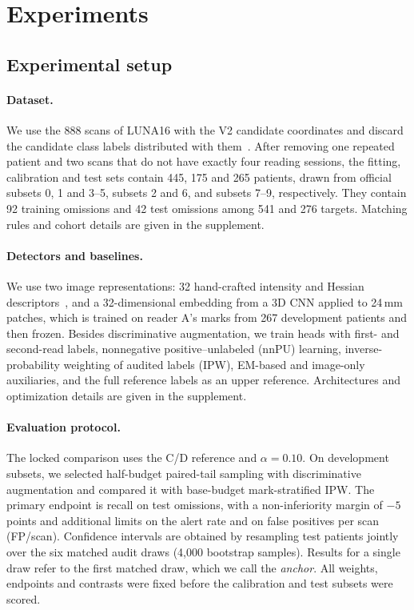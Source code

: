 \section{Experiments}
\label{sec:yield}

\subsection{Experimental setup}
\label{sec:setup}

\paragraph{Dataset.}
We use the 888 scans of LUNA16 with the V2 candidate coordinates and discard the candidate class labels distributed with them~\cite{setio2017,luna16v2}. After removing one repeated patient and two scans that do not have exactly four reading sessions, the fitting, calibration and test sets contain 445, 175 and 265 patients, drawn from official subsets 0, 1 and 3--5, subsets 2 and 6, and subsets 7--9, respectively. They contain 92 training omissions and 42 test omissions among 541 and 276 targets. Matching rules and cohort details are given in the supplement.

\paragraph{Detectors and baselines.}
We use two image representations: 32 hand-crafted intensity and Hessian descriptors~\cite{li2003}, and a 32-dimensional embedding from a 3D CNN applied to 24\,mm patches, which is trained on reader A's marks from 267 development patients and then frozen. Besides discriminative augmentation, we train heads with first- and second-read labels, nonnegative positive--unlabeled (nnPU) learning, inverse-probability weighting of audited labels (IPW), EM-based and image-only auxiliaries, and the full reference labels as an upper reference. Architectures and optimization details are given in the supplement.

\paragraph{Evaluation protocol.}
The locked comparison uses the C/D reference and $\alpha=0.10$. On development subsets, we selected half-budget paired-tail sampling with discriminative augmentation and compared it with base-budget mark-stratified IPW. The primary endpoint is recall on test omissions, with a non-inferiority margin of $-5$ points and additional limits on the alert rate and on false positives per scan (FP/scan). Confidence intervals are obtained by resampling test patients jointly over the six matched audit draws (4,000 bootstrap samples). Results for a single draw refer to the first matched draw, which we call the \emph{anchor}. All weights, endpoints and contrasts were fixed before the calibration and test subsets were scored.

